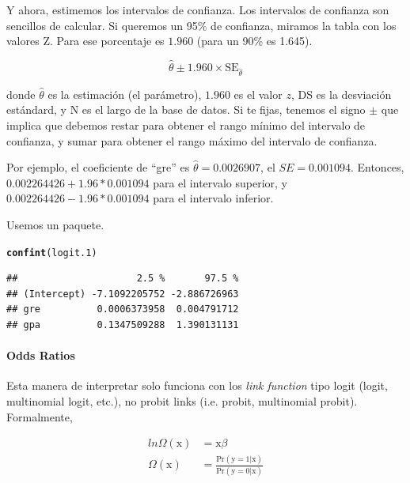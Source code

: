 \documentclass[onesided]{article}\usepackage[]{graphicx}\usepackage[]{color}
\makeatletter
\newcommand{\hlstd}[1]{\textcolor[rgb]{0.345,0.345,0.345}{#1}}%
\newcommand{\hlkwd}[1]{\textcolor[rgb]{0.737,0.353,0.396}{\textbf{#1}}}%
\newenvironment{kframe}{%
 \def\at@end@of@kframe{}%
 \ifinner\ifhmode%
  \def\at@end@of@kframe{\end{minipage}}%
  \begin{minipage}{\columnwidth}%
 \fi\fi%
 \def\FrameCommand##1{\hskip\@totalleftmargin \hskip-\fboxsep
 \colorbox{shadecolor}{##1}\hskip-\fboxsep
     \hskip-\linewidth \hskip-\@totalleftmargin \hskip\columnwidth}%
 \MakeFramed {\advance\hsize-\width
   \@totalleftmargin\z@ \linewidth\hsize
   \@setminipage}}%
 {\par\unskip\endMakeFramed%
 \at@end@of@kframe}
\newenvironment{knitrout}{}{} %
\makeatother
\begin{document}
Y ahora, estimemos los intervalos de confianza. Los intervalos de confianza son sencillos de calcular. Si queremos un 95\% de confianza, miramos la tabla con los valores Z. Para ese porcentaje es $1.960$ (para un 90\% es 1.645). 

\begin{equation}
\hat\theta \pm 1.960 \times \text{SE}_{\hat\theta}
\end{equation}

donde $\hat\theta$ es la estimaci\'on (el par\'ametro), $1.960$ es el valor $z$, DS es la desviaci\'on est\'andard, y N es el largo de la base de datos. Si te fijas, tenemos el signo $\pm$ que implica que debemos restar para obtener el rango m\'inimo del intervalo de confianza, y sumar para obtener el rango m\'aximo del intervalo de confianza.

Por ejemplo, el coeficiente de ``gre'' es $\hat\theta=0.0026907$, el $SE = 0.001094$. Entonces, $0.002264426 + 1.96*0.001094$ para el intervalo superior, y $0.002264426 - 1.96*0.001094$ para el intervalo inferior. 

Usemos un paquete.



\begin{knitrout}
\color{fgcolor}\begin{kframe}
\begin{alltt}
\hlkwd{confint}\hlstd{(logit.1)}
\end{alltt}
\begin{verbatim}
##                     2.5 %       97.5 %
## (Intercept) -7.1092205752 -2.886726963
## gre          0.0006373958  0.004791712
## gpa          0.1347509288  1.390131131
\end{verbatim}
\end{kframe}
\end{knitrout}


\paragraph{Odds Ratios}

Esta manera de interpretar solo funciona con los \emph{link function} tipo logit (logit, multinomial logit, etc.), no probit links (i.e. probit, multinomial probit). Formalmente, 

\begin{equation}\label{odd:ratio}
\begin{split}
ln \Omega(\text{x}) & = \text{x}\beta \\
\Omega(\text{x}) & = \frac{\text{Pr}(\text{y}=1 | \text{x})}{\text{Pr}(\text{y}=0 | \text{x})} 
\end{split}
\end{equation}
\end{document}
